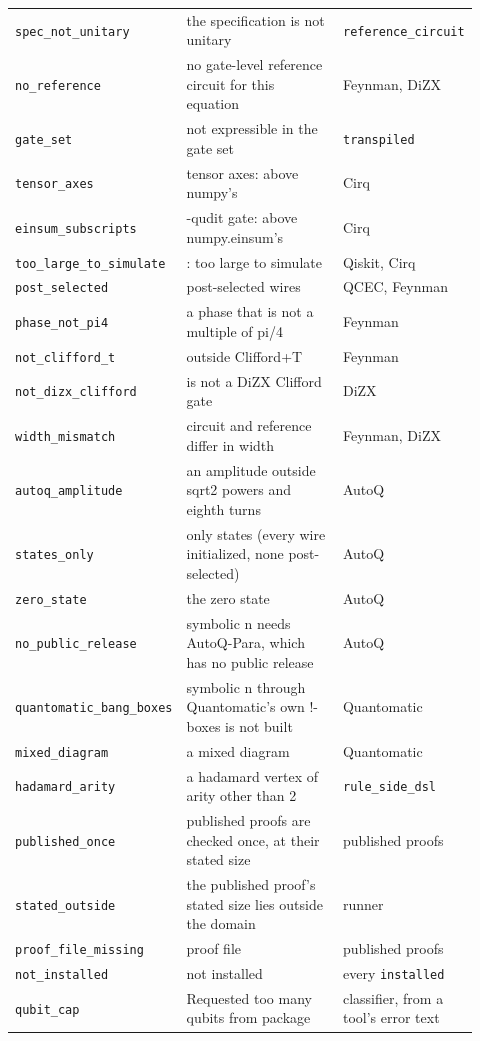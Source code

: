\begin{longtable}{@{}>{\raggedright\arraybackslash}p{0.27\linewidth}>{\raggedright\arraybackslash}p{0.42\linewidth}>{\raggedright\arraybackslash}p{0.23\linewidth}@{}}
\texttt{spec\_not\_unitary} & the specification is not unitary & \texttt{reference\_circuit} \\
\texttt{no\_reference} & no gate-level reference circuit for this equation & Feynman, DiZX \\
\texttt{gate\_set} & not expressible in the gate set & \texttt{transpiled} \\
\texttt{tensor\_axes} & \textvisiblespace tensor axes: above numpy's & Cirq \\
\texttt{einsum\_subscripts} & -qudit gate: above numpy.einsum's & Cirq \\
\texttt{too\_large\_to\_simulate} & : too large to simulate & Qiskit, Cirq \\
\texttt{post\_selected} & post-selected wires & QCEC, Feynman \\
\texttt{phase\_not\_pi4} & a phase that is not a multiple of pi/4 & Feynman \\
\texttt{not\_clifford\_t} & \textvisiblespace outside Clifford+T & Feynman \\
\texttt{not\_dizx\_clifford} & \textvisiblespace is not a DiZX Clifford gate & DiZX \\
\texttt{width\_mismatch} & circuit and reference differ in width & Feynman, DiZX \\
\texttt{autoq\_amplitude} & an amplitude outside sqrt2 powers and eighth turns & AutoQ \\
\texttt{states\_only} & only states (every wire initialized, none post-selected) & AutoQ \\
\texttt{zero\_state} & the zero state & AutoQ \\
\texttt{no\_public\_release} & symbolic n needs AutoQ-Para, which has no public release & AutoQ \\
\texttt{quantomatic\_bang\_boxes} & symbolic n through Quantomatic's own !-boxes is not built & Quantomatic \\
\texttt{mixed\_diagram} & a mixed diagram & Quantomatic \\
\texttt{hadamard\_arity} & a hadamard vertex of arity other than 2 & \texttt{rule\_side\_dsl} \\
\texttt{published\_once} & published proofs are checked once, at their stated size & published proofs \\
\texttt{stated\_outside} & the published proof's stated size lies outside the domain & runner \\
\texttt{proof\_file\_missing} & \textvisiblespace proof file\textvisiblespace & published proofs \\
\texttt{not\_installed} & not installed & every \texttt{installed} \\
\texttt{qubit\_cap} & Requested too many qubits from package & classifier, from a tool's error text \\
\end{longtable}

